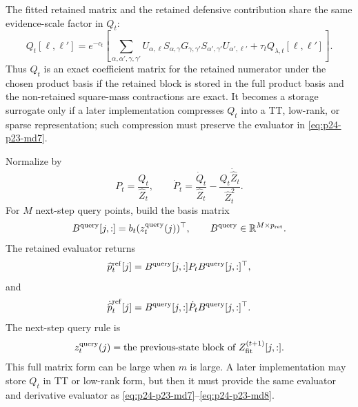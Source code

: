 \documentclass[11pt]{article}
\numberwithin{equation}{section}
\newcommand{\R}{\mathbb R}
\begin{document}
The fitted retained matrix and the retained defensive contribution share the
same evidence-scale factor in \(Q_t\):
\begin{equation}
    Q_t[\ell,\ell']
    =
    e^{-c_t}\left[
    \sum_{\alpha,\alpha',\gamma,\gamma'}
    U_{\alpha,\ell}S_{\alpha,\gamma}
    G_{\gamma,\gamma'}
    S_{\alpha',\gamma'}U_{\alpha',\ell'}
    +
    \tau_t Q_{\lambda,t}[\ell,\ell']
    \right].
    \label{eq:p24-p23-md4e}
\end{equation}
Thus \(Q_t\) is an exact coefficient matrix for the retained numerator under
the chosen product basis if the retained block is stored in the full product
basis and the non-retained square-mass contractions are exact.  It becomes a
storage surrogate only if a later implementation compresses \(Q_t\) into a TT,
low-rank, or sparse representation; such compression must preserve the
evaluator in \eqref{eq:p24-p23-md7}.

Normalize by
\begin{equation}
    P_t=\frac{Q_t}{\widehat Z_t},
    \qquad
    \dot P_t=
    \frac{\dot Q_t}{\widehat Z_t}
    -
    \frac{Q_t\dot{\widehat Z}_t}{\widehat Z_t^2}.
    \label{eq:p24-p23-md5}
\end{equation}
For \(M\) next-step query points, build the basis matrix
\begin{equation}
    B^{\rm query}[j,:]=b_t(z_t^{\rm query}(j))^\top,
    \qquad
    B^{\rm query}\in\R^{M\times p_{\rm ret}}.
    \label{eq:p24-p23-md6}
\end{equation}
The retained evaluator returns
\begin{equation}
    \widehat p_t^{\rm ref}[j]
    =
    B^{\rm query}[j,:]P_tB^{\rm query}[j,:]^\top,
    \label{eq:p24-p23-md7}
\end{equation}
and
\begin{equation}
    \dot{\widehat p}_t^{\rm ref}[j]
    =
    B^{\rm query}[j,:]\dot P_tB^{\rm query}[j,:]^\top.
    \label{eq:p24-p23-md8}
\end{equation}
The next-step query rule is
\begin{equation}
    z_t^{\rm query}(j)
    =
    \text{the previous-state block of }Z_{\rm fit}^{(t+1)}[j,:].
    \label{eq:p24-p23-md9}
\end{equation}
This full matrix form can be large when \(m\) is large.  A later
implementation may store \(Q_t\) in TT or low-rank form, but then it must
provide the same evaluator and derivative evaluator as \eqref{eq:p24-p23-md7}--\eqref{eq:p24-p23-md8}.
\end{document}
